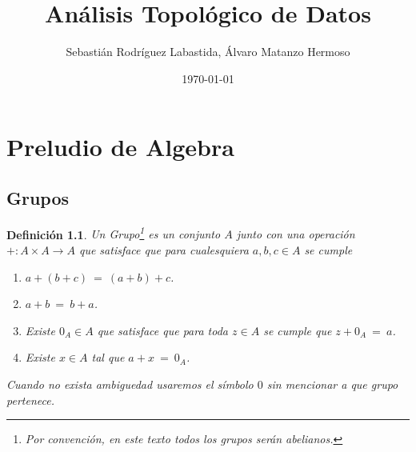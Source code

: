 \documentclass[12pt]{book}
\theoremstyle{plain}
\numberwithin{equation}{section} %
\newtheorem{definition}[thm]{Definición}
\begin{document}
\author{Sebastián Rodríguez Labastida, Álvaro Matanzo Hermoso}
\title{Análisis Topológico de Datos}
\date{\today}
\frontmatter
\maketitle

\chapter{Preludio de Algebra}
\section{Grupos}
\begin{definition}\label{def:grupo}
Un \textit{Grupo}\footnote{Por convención, en este texto todos los grupos serán abelianos.} es un conjunto $A$ junto con una operación $+\colon A\times A\rightarrow A$ que satisface que para cualesquiera $a,b,c \in A$ se cumple
\begin{enumerate}
	\item $a+(b+c) \ =\ (a+b)+c$.
	\item $a+b \ =\ b+a $.
	\item Existe $0_A \in A$ que satisface que para toda $z\in A$ se cumple que $z+0_A \ =\ a$.
	\item Existe $x\in A$ tal que $a+x \ =\ 0_A$.
\end{enumerate}
Cuando no exista ambiguedad usaremos el símbolo $0$ sin mencionar a que grupo pertenece.
\end{definition}
\end{document}
